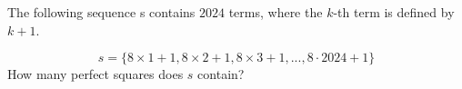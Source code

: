 The following sequence s contains $2024$ terms, where the $k$-th term is defined by $k + 1$.

\[s = \{8 \times 1 + 1, 8 \times 2 + 1, 8 \times 3 + 1, ..., 8 \cdot 2024 + 1\}\]How many perfect squares does $s$ contain?
